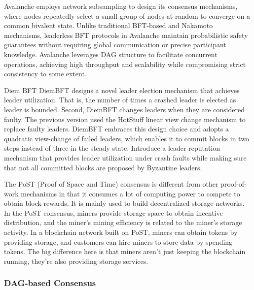 Avalanche\cite{rocket2019scalable} employs network subsampling to design its consensus mechanisms, where nodes repeatedly select a small group of nodes at random to converge on a common bivalent state. 
Unlike traditional BFT-based and Nakamoto mechanisms, leaderless BFT protocols in Avalanche maintain probabilistic safety guarantees without requiring global communication or precise participant knowledge. 
Avalanche leverages DAG structure to facilitate concurrent operations, achieving high throughput and scalability while compromising strict consistency to some extent.

Diem BFT\cite{team2021diembft}
DiemBFT designs a novel leader election mechanism that achieves leader utilization. That is, the number of times a crashed leader is elected as leader is bounded. 
Second, DiemBFT changes leaders when they are considered faulty. The previous version used the HotStuff linear view change mechanism to replace faulty leaders.
DiemBFT embraces this design choice and adopts a quadratic view-change of failed leaders, which enables it to commit blocks in two steps instead of three in the steady state.
Introduce a leader reputation mechanism that provides leader utilization under crash faults while making sure that not all committed blocks are proposed by Byzantine leaders.

The PoST (Proof of Space and Time) consensus \cite{moran2019simple} is different from other proof-of-work mechanisms in that it consumes a lot of computing power to compete to obtain block rewards. It is mainly used to build decentralized storage networks. In the PoST consensus, miners provide storage space to obtain incentive distribution, and the miner's mining efficiency is related to the miner's storage activity. In a blockchain network built on PoST, miners can obtain tokens by providing storage, and customers can hire miners to store data by spending tokens. The big difference here is that miners aren't just keeping the blockchain running, they're also providing storage services.


\subsubsection{DAG-based Consensus}

